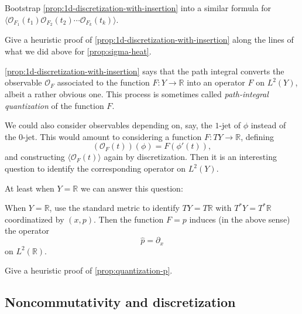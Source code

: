 \documentclass[12pt,letterpaper,reqno]{article}
\numberwithin{equation}{section}
\newcommand{\cO}{\ensuremath{\mathcal O}}
\newcommand{\R}{\ensuremath{\mathbb R}}
\newcommand{\IP}[1]{\langle#1\rangle}
\newcommand{\ti}[1]{\textit{#1}}
\newcommand{\fixme}[1]{{\color{orange}{[#1]}}}
\begin{document}
\begin{exercise}Bootstrap \autoref{prop:1d-discretization-with-insertion} into a similar formula
for $\IP{\cO_{F_1}(t_1) \cO_{F_2}(t_2) \cdots \cO_{F_k}(t_k)}$.
\end{exercise}

\begin{exercise}
Give a heuristic proof of \autoref{prop:1d-discretization-with-insertion} along the lines of 
what we did above for \autoref{prop:sigma-heat}.
\end{exercise}

\autoref{prop:1d-discretization-with-insertion} 
says that the path integral converts the
observable $\cO_F$ associated to the function $F: Y \to \R$ 
into an operator $\hat F$ on $L^2(Y)$, albeit
a rather obvious one. This process is sometimes called
\ti{path-integral quantization} of the function $F$.

We could also consider observables depending on, say, 
the $1$-jet of $\phi$ instead of the $0$-jet. This would 
amount to considering a function $F: TY \to \R$, defining
\begin{equation}
  (\cO_F(t)) (\phi) = F(\phi'(t)),
\end{equation}
and constructing $\IP{\cO_F(t)}$
again by discretization.
Then it is an interesting question to identify 
the corresponding operator on $L^2(Y)$.

At least when $Y = \R$ we can answer this question:
\fixme{though strictly speaking $Y = \R$ was not allowed
in our previous discussion}
\begin{prop} \label{prop:quantization-p}
When $Y = \R$, use the standard 
metric to identify $TY = T\R$ with $T^* Y = T^* \R$
coordinatized by $(x,p)$. Then the function $F = p$
induces (in the above sense) the operator
\begin{equation}
   \hat p = \partial_x
\end{equation} 
on $L^2(\R)$. \fixme{check sign}
\end{prop}

\begin{exercise} Give a heuristic proof
of \autoref{prop:quantization-p}.
\end{exercise}


\subsection{Noncommutativity and discretization}
\end{document}
